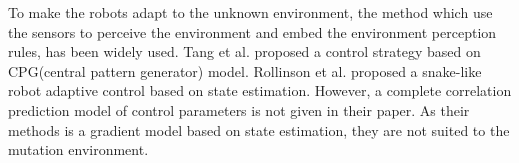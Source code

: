 To make the robots adapt to the unknown environment, the method which use the sensors to perceive the environment and embed the environment perception rules, has been widely used\cite{CPGenabling}\cite{GaitBasedCompliant}\cite{BalancingAndControl}\cite{FeedbackControlOfSoft}. Tang et al. proposed a control strategy based on CPG(central pattern generator) model\cite{CPGenabling}. Rollinson et al. proposed a snake-like robot adaptive control based on state estimation\cite{GaitBasedCompliant}. However, a complete correlation prediction model of control parameters is not given in their paper. As their methods is a gradient model based on state estimation, they are not suited to the mutation environment.

